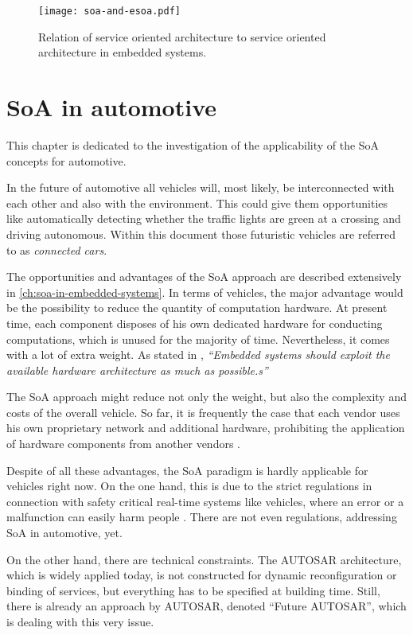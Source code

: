 \begin{figure}[ht]
\centering
\texttt{[image: soa-and-esoa.pdf]}
\caption{Relation of service oriented architecture to service oriented architecture in embedded systems.}
\label{fig:soa-and-esoa}
\end{figure}







\section{SoA in automotive}

This chapter is dedicated to the investigation of the applicability of the SoA concepts for automotive.

In the future of automotive all vehicles will, most likely, be interconnected with each other and also with the environment. This could give them opportunities like automatically detecting whether the traffic lights are green at a crossing and driving autonomous. Within this document those futuristic vehicles are referred to as \emph{connected cars}.


The opportunities and advantages of the SoA approach are described extensively in \ref{ch:soa-in-embedded-systems}. In terms of vehicles, the major advantage would be the possibility to reduce the quantity of computation hardware. At present time, each component disposes of his own dedicated hardware for conducting computations, which is unused for the majority of time. Nevertheless, it comes with a lot of extra weight. As stated in \cite[p.7]{marwedel}, \emph{``Embedded systems should exploit the available hardware architecture as much as possible.s''}

The SoA approach might reduce not only the weight, but also the complexity and costs of the overall vehicle. So far, it is frequently the case that each vendor uses his own proprietary network and additional hardware, prohibiting the application of hardware components from another vendors \cite{sommer}.

Despite of all these advantages, the SoA paradigm is hardly applicable for vehicles right now. On the one hand, this is due to the strict regulations in connection with safety critical real-time systems like vehicles, where an error or a malfunction can easily harm people \cite{kum}. There are not even regulations, addressing SoA in automotive, yet.

On the other hand, there are technical constraints. The AUTOSAR architecture, which is widely applied today, is not constructed for dynamic reconfiguration or binding of services, but everything has to be specified at building time. Still, there is already an approach by AUTOSAR, denoted ``Future AUTOSAR'', which is dealing with this very issue.


